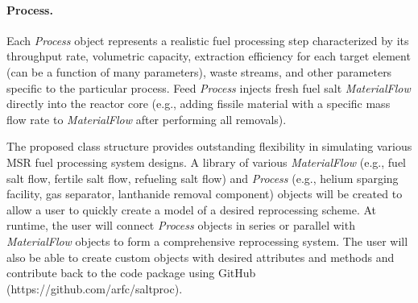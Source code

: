 \paragraph{Process.}Each \textit{Process} object represents a 
realistic fuel processing step characterized by its throughput rate, 
volumetric capacity, extraction efficiency for each target element (can be 
a function of many parameters), waste streams, and other parameters specific 
to the particular process. Feed	\textit{Process} injects fresh fuel salt 
\textit{MaterialFlow} directly into the reactor core (e.g., adding fissile 
material with a specific mass flow rate to \textit{MaterialFlow} after 
performing all removals).

The proposed class structure provides outstanding flexibility in simulating 
various \gls{MSR} fuel processing system designs. A library of various  
\textit{MaterialFlow} (e.g., fuel salt flow, fertile salt flow, refueling salt 
flow) and \textit{Process} (e.g., helium sparging facility, gas separator, 
lanthanide removal component) objects will be created to allow a user to 
quickly create a model of a desired reprocessing scheme. At runtime, the user 
will connect \textit{Process} objects in series or parallel with 
\textit{MaterialFlow} objects to form a comprehensive reprocessing system. The 
user will also be able to create custom objects with desired attributes and 
methods and contribute back to the code package using GitHub 
(https://github.com/arfc/saltproc).	


